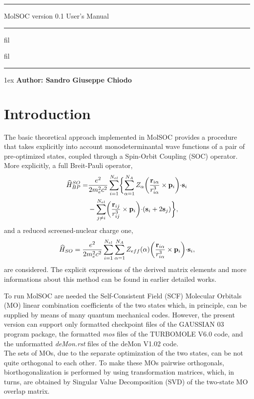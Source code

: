 \documentclass[a4paper,12pt]{article}
\newcommand{\m}[1]{\mathbf #1}
\newcommand{\wh}{\widehat}
\def\thismanual{MolSOC}
\begin{document}
\def\thismanual{User's Manual}
\begin{titlepage}
\begin{center}
\hrule depth 1pt height 1pt
\vskip 5mm
{\huge {\sf MolSOC} version 0.1}
\vskip 5mm
{\LARGE \thismanual}
\vskip 5mm
\hrule depth 1pt height 1pt
 fil
\vskip 5mm
\centerline{\logo[80mm]}
\vskip 5mm
 fil
\hrule depth 1pt height 1pt
\vskip 10mm
{\noindent\raise1ex\hbox{\normalsize} {\bf Author: Sandro Giuseppe Chiodo}}
\end{center}
\end{titlepage}
\newpage
\section{Introduction}

The basic theoretical approach implemented in {\sf MolSOC} provides a procedure that 
takes explicitly into account 
monodeterminantal wave functions of a pair of pre-optimized states, coupled through 
a Spin-Orbit Coupling (SOC) operator. More explicitly, a full Breit-Pauli operator\cite{Breit}, 
\begin{equation}
\begin{split}
 \wh H^{SO}_{BP} = & \frac {e^2} {2m^2_e c^2} \sum_{i=1}^{N_{el}} \biggl{\{} \sum_{\alpha = 1}^{N_{A}}
 Z_{\alpha} \biggl{(} \frac {\m{r}_{i \alpha}} {r_{i \alpha} ^3} \times
\m{p}_{i} \biggl{)} \cdot \m{s}_{i} \\
 & - \sum_{j \ne i}^{N_{el}} \biggl{(} \frac {\m{r}_{ij}} {r^3_{ij}} \times \m{p}_{i} \biggl{)}
\cdot (\m{s}_{i} + 2\m{s}_{j}) \biggl{\}}, \label{1}
\end{split}
\end{equation}
and a reduced screened-nuclear charge one,
\begin{equation}
 \wh H_{SO} = \frac {e^2} {2m^2_e c^2} \sum_{i=1}^{N_{el}} \sum_{\alpha = 1}^{N_{A}}
 Z_{eff}(\alpha) \biggl{(} \frac {\m{r}_{i \alpha}} {r_{i \alpha} ^3} \times
\m{p}_{i} \biggl{)} \cdot \m{s}_{i}, \label{1}
\end{equation}
are considered.
The explicit expressions of the derived matrix elements 
and more informations about this method can be found in earlier detailed 
works\cite{Chiod1,Chiod2}.

To run {\sf MolSOC} are needed the Self-Consistent Field (SCF) Molecular Orbitals (MO) 
linear combination coefficients of the two states which, in principle, 
can be supplied by means of many quantum mechanical codes. However, the present version can support only
formatted checkpoint files of the {\sf GAUSSIAN 03} program package, the formatted {\em mos} files
of the {\sf TURBOMOLE V6.0} code, and the unformatted {\em deMon.rst} files of the
{\sf deMon V1.02} code. \\ 
The sets of MOs, due 
to the separate optimization of the two states, can be not quite orthogonal to each other. 
To make these MOs pairwise orthogonals, biorthogonalization is 
performed by using transformation matrices, which, in turns, are 
obtained by Singular Value Decomposition (SVD) of the two-state MO overlap matrix.
\end{document}
